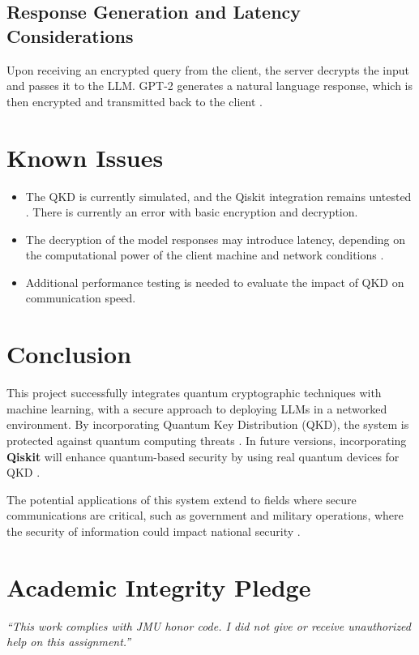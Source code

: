 \documentclass{article}
\begin{document}
\subsection{Response Generation and Latency Considerations}
Upon receiving an encrypted query from the client, the server decrypts the input and passes it to the LLM. GPT-2 generates a natural language response, which is then encrypted and transmitted back to the client \parencite{huggingface_gpt2_2024}. 

\section{Known Issues}
\begin{itemize}
    \item The QKD is currently simulated, and the Qiskit integration remains untested \parencite{nsa2024}. There is currently an error with basic encryption and decryption.
    \item The decryption of the model responses may introduce latency, depending on the computational power of the client machine and network conditions \parencite{huggingface_gpt2_2024}.
    \item Additional performance testing is needed to evaluate the impact of QKD on communication speed.
\end{itemize}

\section{Conclusion}
This project successfully integrates quantum cryptographic techniques with machine learning, with a secure approach to deploying LLMs in a networked environment. By incorporating Quantum Key Distribution (QKD), the system is protected against quantum computing threats \parencite{nsa2024}. In future versions, incorporating \textbf{Qiskit} will enhance quantum-based security by using real quantum devices for QKD \parencite{nielsen2010}.

The potential applications of this system extend to fields where secure communications are critical, such as government and military operations, where the security of information could impact national security \parencite{nsa2024}.

\newpage
\printbibliography %

\vfill
\section*{Academic Integrity Pledge}
{\color{red}\textit{“This work complies with JMU honor code. I did not give or receive unauthorized help on this assignment.”}}
\end{document}
